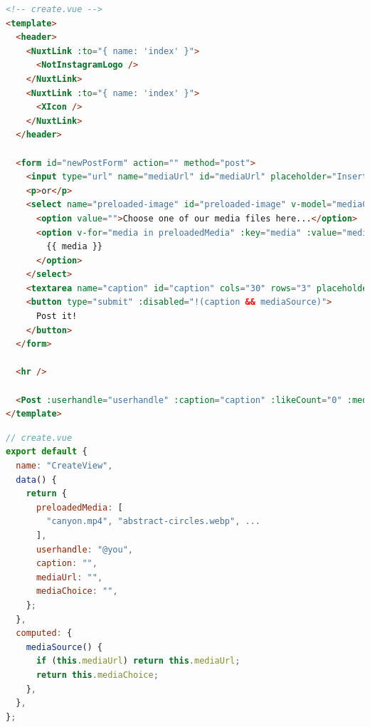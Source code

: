 \documentclass[a4paper, 10pt]{article}
\begin{document}
\begin{lstlisting}[caption=Create page in Nuxt (Template), label={lst:Nuxt:Create:Template}, language=HTML]
<!-- create.vue -->
<template>
  <header>
    <NuxtLink :to="{ name: 'index' }">
      <NotInstagramLogo />
    </NuxtLink>
    <NuxtLink :to="{ name: 'index' }">
      <XIcon />
    </NuxtLink>
  </header>
  
  <form id="newPostForm" action="" method="post">
    <input type="url" name="mediaUrl" id="mediaUrl" placeholder="Insert your media URL here..." v-model="mediaUrl" />
    <p>or</p>
    <select name="preloaded-image" id="preloaded-image" v-model="mediaChoice">
      <option value="">Choose one of our media files here...</option>
      <option v-for="media in preloadedMedia" :key="media" :value="media">
        {{ media }}
      </option>
    </select>
    <textarea name="caption" id="caption" cols="30" rows="3" placeholder="Type your caption here" v-model="caption" />
    <button type="submit" :disabled="!(caption && mediaSource)">
      Post it!
    </button>
  </form>
  
  <hr />
  
  <Post :userhandle="userhandle" :caption="caption" :likeCount="0" :mediaSource="mediaSource" :hideActionIcons="true" />
</template>
\end{lstlisting}

\begin{lstlisting}[caption=Create page in Nuxt (Script), label={lst:Nuxt:Create:Script}, language=JavaScript, firstnumber=31]
// create.vue
export default {
  name: "CreateView",
  data() {
    return {
      preloadedMedia: [
        "canyon.mp4", "abstract-circles.webp", ...
      ],
      userhandle: "@you",
      caption: "",
      mediaUrl: "",
      mediaChoice: "",
    };
  },
  computed: {
    mediaSource() {
      if (this.mediaUrl) return this.mediaUrl;
      return this.mediaChoice;
    },
  },
};
\end{lstlisting}
\end{document}
